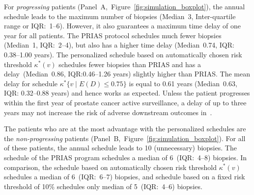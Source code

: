 For \textit{progressing} patients (Panel~A,~Figure~\ref{fig:simulation_boxplot}), the annual schedule leads to the maximum number of biopsies (Median~3, Inter-quartile range or IQR:~1--6). However, it also guarantees a maximum time delay of one year for all patients. The PRIAS protocol schedules much fewer biopsies (Median~1, IQR:~2--4), but also has a higher time delay (Median~0.74, IQR: 0.38--1.00 years). The personalized schedule based on automatically chosen risk threshold $\kappa^*(v)$ schedules fewer biopsies than PRIAS and has a delay~(Median~0.86, IQR:0.46--1.26 years) slightly higher than PRIAS. The mean delay for schedule $\kappa^*\{v \mid E(D)\leq 0.75\}$ is equal to 0.61 years (Median~0.63, IQR: 0.32--0.88 years) and hence works as expected. Unless the patient progresses within the first year of prostate cancer active surveillance, a delay of up to three years may not increase the risk of adverse downstream outcomes in~\citep{inoue2018comparative,carvalho}. 

The patients who are at the most advantage with the personalized schedules are the \textit{non-progressing} patients (Panel~B,~Figure~\ref{fig:simulation_boxplot}). For all of these patients, the annual schedule leads to 10 (unnecessary) biopsies. The schedule of the PRIAS program schedules a median of 6~(IQR:~4--8) biopsies. In comparison, the schedule based on automatically chosen risk threshold $\kappa^*(v)$ schedules a median of 6~(IQR:~6--7) biopsies, and schedule based on a fixed risk threshold of 10\% schedules only median of 5~(IQR:~4--6) biopsies.

